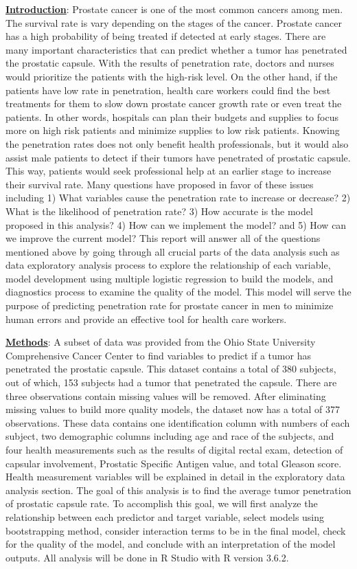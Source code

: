 \documentclass[11pt]{article}\usepackage[]{graphicx}\usepackage[]{color}
\begin{document}
\noindent\textbf{\underline{Introduction}}: Prostate cancer is one of the most common cancers among men. The survival rate is vary depending on the stages of the cancer. Prostate cancer has a high probability of being treated if detected at early stages. There are many important characteristics that can predict whether a tumor has penetrated the prostatic capsule. With the results of penetration rate, doctors and nurses would prioritize the patients with the high-risk level. On the other hand, if the patients have low rate in penetration, health care workers could find the best treatments for them to slow down prostate cancer growth rate or even treat the patients. In other words, hospitals can plan their budgets and supplies to focus more on high risk patients and minimize supplies to low risk patients. Knowing the penetration rates does not only benefit health professionals, but it would also assist male patients to detect if their tumors have penetrated of prostatic capsule. This way, patients would seek professional help at an earlier stage to increase their survival rate. Many questions have proposed in favor of these issues including 1) What variables cause the penetration rate to increase or decrease? 2) What is the likelihood of penetration rate? 3) How accurate is the model proposed in this analysis? 4) How can we implement the model? and 5) How can we improve the current model? This report will answer all of the questions mentioned above by going through all crucial parts of the data analysis such as data exploratory analysis process to explore the relationship of each variable, model development using multiple logistic regression to build the models, and diagnostics process to examine the quality of the model. This model will serve the purpose of predicting penetration rate for prostate cancer in men to minimize human errors and provide an effective tool for health care workers.
\hfill \break

\noindent\textbf{\underline{Methods}}: A subset of data was provided from the Ohio State University Comprehensive Cancer Center to find variables to predict if a tumor has penetrated the prostatic capsule. This dataset contains a total of 380 subjects, out of which, 153 subjects had a tumor that penetrated the capsule. There are three observations contain missing values will be removed. After eliminating missing values to build more quality models, the dataset now has a total of 377 observations. These data contains one identification column with numbers of each subject, two demographic columns including age and race of the subjects, and four health measurements such as the results of digital rectal exam, detection of capsular involvement, Prostatic Specific Antigen value, and total Gleason score. Health measurement variables will be explained in detail in the exploratory data analysis section. The goal of this analysis is to find the average tumor penetration of prostatic capsule rate. To accomplish this goal, we will first analyze the relationship between each predictor and target variable, select models using bootstrapping method, consider interaction terms to be in the final model, check for the quality of the model, and conclude with an interpretation of the model outputs. All analysis will be done in R Studio with R version 3.6.2.       
\hfill \break
\end{document}

